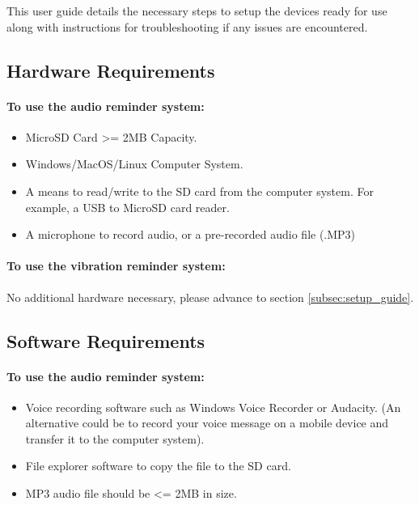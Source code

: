 			This user guide details the necessary steps to setup the devices ready for use along with instructions for troubleshooting if any issues are encountered.

		\subsection{Hardware Requirements}
		\label{subsec:hardware_reqs}

			\paragraph{To use the audio reminder system:}\mbox{}

			\begin{itemize}
				\item MicroSD Card >= 2MB Capacity.
				\item Windows/MacOS/Linux Computer System.
				\item A means to read/write to the SD card from the computer system. For example, a USB to MicroSD card reader.
				\item A microphone to record audio, or a pre-recorded audio file (.MP3)
			\end{itemize}

			\paragraph{To use the vibration reminder system:}\mbox{}

			No additional hardware necessary, please advance to section \ref{subsec:setup_guide}.

		\subsection{Software Requirements}
		\label{subsec:software_reqs}

			\paragraph{To use the audio reminder system:}\mbox{}

			\begin{itemize}
				\item Voice recording software such as Windows Voice Recorder or Audacity. (An alternative could be to record your voice message on a mobile device and transfer it to the computer system).
				\item File explorer software to copy the file to the SD card.
				\item MP3 audio file should be <= 2MB in size.
			\end{itemize}

